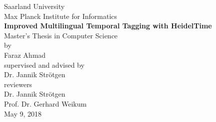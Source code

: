 \documentclass[a4paper, 12pt, twoside, openright]{Thesis} %
\begin{document}
\frontmatter      %


\thispagestyle{empty}
{%
	\sffamily
	\centering
	\Large
	
	\vspace{\fill}
	
	{\LARGE Saarland University \\}
	{\Large Max Planck Institute for Informatics \\}
	\bigskip
	\bigskip
	\bigskip
	{\huge \bf \textbf{Improved Multilingual Temporal Tagging with HeidelTime} \\}
	\bigskip
	\bigskip
	{Master's Thesis in Computer Science \\}
	{by \\}
	{\LARGE Faraz Ahmad \\}
	\bigskip
	\bigskip
	{supervised and advised by \\}
	{\LARGE Dr. Jannik Str{\"{o}}tgen \\}
	\bigskip
	\bigskip
	\bigskip
	{reviewers \\}
	{\LARGE Dr. Jannik Str{\"{o}}tgen \\}
	{\LARGE Prof. Dr. Gerhard Weikum \\}
	\bigskip
	\bigskip
	{\Large May 9, 2018 \\}
	\bigskip
	\bigskip
	\bigskip
	\bigskip
	

\begin{figure}[h]
	\centering
	\hfill
\end{figure}
	
	
	\vspace{\fill}
	
	
}%
\end{document}
